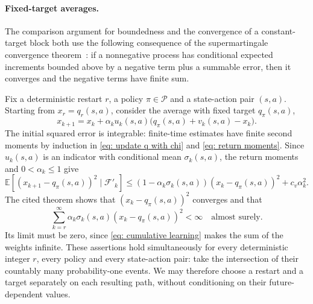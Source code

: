 \paragraph{Fixed-target averages.}
\label{app: fixed target averages}
The comparison argument for boundedness and the convergence of a constant-target block both use the following consequence of the supermartingale convergence theorem~\citep[Proposition~4.2]{Bertsekas1996Neuro-DynamicProgramming}: if a nonnegative process has conditional expected increments bounded above by a negative term plus a summable error, then it converges and the negative terms have finite sum.

Fix a deterministic restart $r$, a policy $\pi\in\mathcal P$ and a state-action pair $(s,a)$.
Starting from $x_r=q_r(s,a)$, consider the average with fixed target $q_\pi(s,a)$,
\[
x_{k+1}=x_k+\alpha_k u_k(s,a)\big(q_\pi(s,a)+v_k(s,a)-x_k\big).
\]
The initial squared error is integrable: finite-time estimates have finite second moments by induction in \eqref{eq: update q with chi} and \eqref{eq: return moments}.
Since $u_k(s,a)$ is an indicator with conditional mean $\sigma_k(s,a)$, the return moments and $0<\alpha_k\le1$ give
\[
\mathbb E\!\left[(x_{k+1}-q_\pi(s,a))^2\mid\mathcal F'_k\right]
\le (1-\alpha_k\sigma_k(s,a))(x_k-q_\pi(s,a))^2+c_v\alpha_k^2.
\]
The cited theorem shows that $(x_k-q_\pi(s,a))^2$ converges and that
\[
\sum_{k=r}^{\infty}\alpha_k\sigma_k(s,a)(x_k-q_\pi(s,a))^2<\infty
\quad\text{almost surely}.
\]
Its limit must be zero, since \eqref{eq: cumulative learning} makes the sum of the weights infinite.
These assertions hold simultaneously for every deterministic integer $r$, every policy and every state-action pair: take the intersection of their countably many probability-one events. We may therefore choose a restart and a target separately on each resulting path, without conditioning on their future-dependent values.

